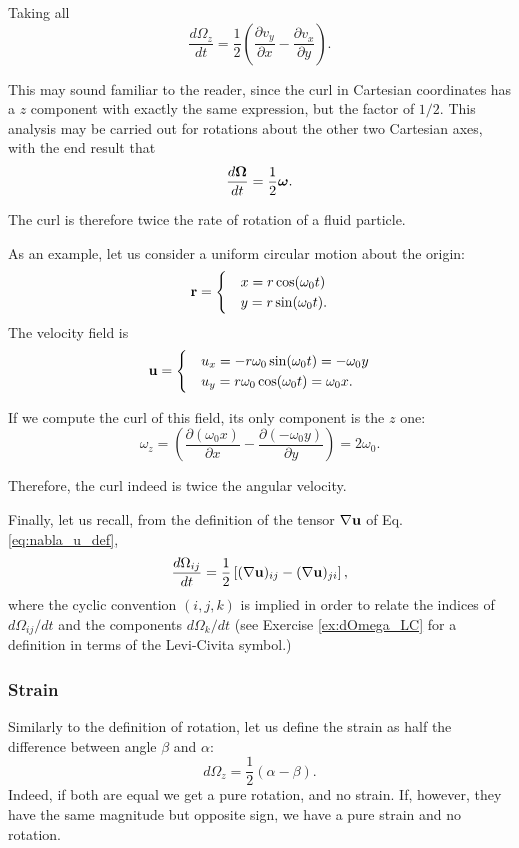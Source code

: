 Taking all
\[
\frac{d\Omega_z}{dt} = \frac12
\left(
  \frac{\partial v_y}{\partial x}  -
  \frac{\partial v_x}{\partial y}
\right) .
\]

This may sound familiar to the reader, since the curl in Cartesian
coordinates has a $z$ component with exactly the same expression, but
the factor of $1/2$. This analysis may be carried out for
rotations about the other two Cartesian axes, with the end result that
\[
 \frac{d \bm{\Omega} }{dt} = \frac12 \bm{\omega} .
\]

The curl is therefore twice the rate of rotation of a fluid particle.


As an example, let us consider a uniform circular motion about the
origin:
\[
\mathbf{r} =
\begin{cases}
&x=r \cos(\omega_0 t) \\
&y=r \sin(\omega_0 t) .
\end{cases}
\]
The velocity field is
\[
\mathbf{u} =
\begin{cases}
&u_x= -r \omega_0 \sin(\omega_0 t) = -\omega_0 y \\
&u_y=  r \omega_0 \cos(\omega_0 t) =  \omega_0 x.
\end{cases}
\]

If we compute the curl of this field, its only component is the $z$ one:
\[
\omega_z= \left(
  \frac{\partial (\omega_0  x)}{\partial x}  -
  \frac{\partial (- \omega_0 y) }{\partial y}
\right) =  2 \omega_0 . 
\]

Therefore, the curl indeed is twice the angular velocity.

Finally, let us recall, from the definition of the tensor
$\nabla \mathbf{u}$ of Eq. \ref{eq:nabla_u_def},
\begin{equation}
  \label{eq:dOmega_as_grad_u}
  \frac{d\Omega_{ij}}{dt} = \frac12
  \left[
    (\nabla \mathbf{u})_{ij} -
    (\nabla \mathbf{u})_{ji}
  \right] ,  
\end{equation}
%
where the cyclic convention $(i,j,k)$ is implied in order to relate
the indices of $d\Omega_{ij}/ dt$ and the components $d\Omega_k/ dt$
(see Exercise \ref{ex:dOmega_LC} for a definition in terms of the
Levi-Civita symbol.)


\subsubsection{Strain}

Similarly to the definition of rotation, let us define the strain as
half the difference between angle $\beta$ and $\alpha$:
\[
d\Omega_z = \frac12
\left(
        \alpha - \beta
\right) .
\]
Indeed, if both are equal we get a pure rotation, and no strain. If,
however, they have the same magnitude but opposite sign, we have a pure
strain and no rotation.

